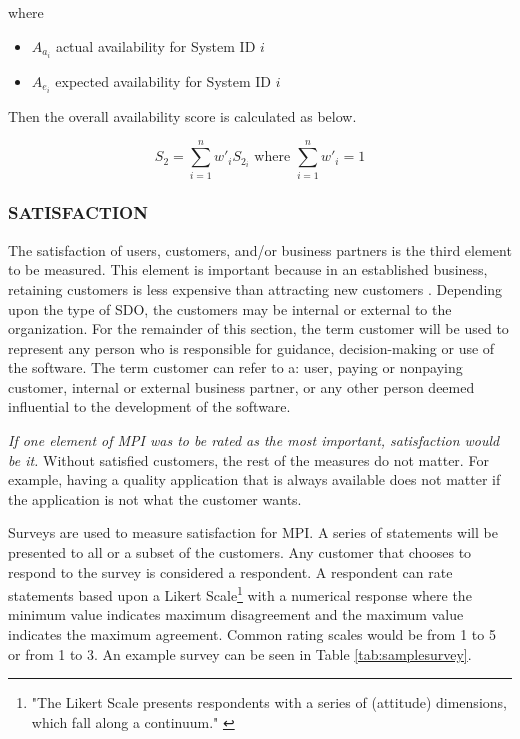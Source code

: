 \documentclass[SDSUThesis.tex]{subfiles}
\begin{document}
                where
                
                \begin{itemize}
                    \item $A_{a_i}$ actual availability for System ID $i$
                    \item $A_{e_i}$ expected availability for System ID $i$
                \end{itemize}
                
                Then the overall availability score is calculated as below.
                
                \[
                    S_{2} = \sum\limits^n_{i=1} w'_i S_{2_i} \text{ where } \sum\limits^n_{i=1} w'_i = 1
                \]
                
        \subsubsection{SATISFACTION}
            The satisfaction of users, customers, and/or business partners is 
            the third element to be measured.  This element is important because 
            in an established business, retaining customers is less expensive
            than attracting new customers \cite{Aulet2013}.  
            Depending upon the type of SDO,
            the customers may be internal or external to the organization.  For
            the remainder of this section, the term customer will be used
            to represent any person who is responsible for guidance, decision-making
            or use of the software.  The term customer can refer to a: user, paying or nonpaying
            customer, internal or external business partner, or any other person deemed influential
            to the development of the software.
            
            \textit{If one element of MPI was to be rated as the most important, satisfaction
            would be it.}  
            Without satisfied customers, the rest of the measures do not matter.
            For example, having a quality
            application that is always available does not matter if the
            application is not what the customer wants.  
            
            Surveys are used to measure satisfaction for MPI.  A series of statements will
            be presented to all or a subset of the customers.  Any customer that chooses
            to respond to the survey is considered a respondent.  A respondent can rate
            statements based upon a Likert Scale\footnote{"The Likert Scale presents 
            respondents with a series of (attitude) dimensions, which fall along a
            continuum." \cite{Cowles2015}} with a numerical response where the 
            minimum value indicates maximum
            disagreement and the maximum value indicates
            the maximum agreement. Common rating scales would be
            from 1 to 5 or from 1 to 3.  An example survey can be seen in Table 
            \ref{tab:samplesurvey}.
            
\end{document}
